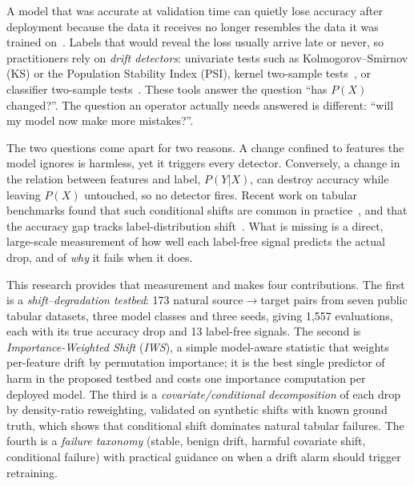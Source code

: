 \documentclass[conference]{IEEEtran}
\makeatletter
\def\section{\@startsection{section}{1}{\z@}{1.5ex plus 1.5ex minus 0.5ex}{0.7ex plus 1ex minus 0ex}{\normalfont\normalsize\centering\itshape}}
\theoremstyle{plainhead}
\newcommand{\iws}{\textit{IWS}}
\makeatother
\begin{document}
\par\vspace{4pt}\par

\section{Introduction}
A model that was accurate at validation time can quietly lose accuracy after deployment because the data it receives no longer resembles the data it was trained on~\cite{hinder2024a,liu2023need}. Labels that would reveal the loss usually arrive late or never, so practitioners rely on \emph{drift detectors}: univariate tests such as Kolmogorov--Smirnov (KS) or the Population Stability Index (PSI), kernel two-sample tests~\cite{biggs2023mmdfuse}, or classifier two-sample tests~\cite{pandeva2024e,nguyen2025reliably}. These tools answer the question ``has $P(X)$ changed?''. The question an operator actually needs answered is different: ``will my model now make more mistakes?''.

The two questions come apart for two reasons. A change confined to features the model ignores is harmless, yet it triggers every detector. Conversely, a change in the relation between features and label, $P(Y|X)$, can destroy accuracy while leaving $P(X)$ untouched, so no detector fires. Recent work on tabular benchmarks found that such conditional shifts are common in practice~\cite{liu2023need}, and that the accuracy gap tracks label-distribution shift~\cite{gardner2023tableshift}. What is missing is a direct, large-scale measurement of how well each label-free signal predicts the actual drop, and of \emph{why} it fails when it does.

This research provides that measurement and makes four contributions. The first is a \textit{shift--degradation testbed}: 173 natural source$\to$target pairs from seven public tabular datasets, three model classes and three seeds, giving 1{,}557 evaluations, each with its true accuracy drop and 13 label-free signals. The second is \textit{Importance-Weighted Shift} (\iws{}), a simple model-aware statistic that weights per-feature drift by permutation importance; it is the best single predictor of harm in the proposed testbed and costs one importance computation per deployed model. The third is a \textit{covariate/conditional decomposition} of each drop by density-ratio reweighting, validated on synthetic shifts with known ground truth, which shows that conditional shift dominates natural tabular failures. The fourth is a \textit{failure taxonomy} (stable, benign drift, harmful covariate shift, conditional failure) with practical guidance on when a drift alarm should trigger retraining.
\end{document}
